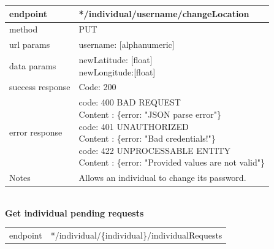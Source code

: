 \begin{legal}
\begin{legal}
\begin{itemize}
							\begin{tabularx}{\linewidth}{| l| l }
								\hline
								endpoint & */individual/{username}/changeLocation \\
								\hline
								method & PUT \\
								\hline
								url params & 
								\parbox{0.7\textwidth}{
									\bigskip
									username: [alphanumeric]
									\bigskip
								}\\
								\hline
								data params & 
								\parbox{0.7\textwidth}{
									\bigskip
									newLatitude: [float]\\
									newLongitude:[float]
									\bigskip
								} \\
								\hline
								success response &
								\parbox{0.7\textwidth}{
									\bigskip
									Code: 200
									\bigskip
								} \\
								\hline
								error response &
								\parbox{0.7\textwidth}{
									\bigskip
									code: 400 BAD REQUEST \\
									Content : \{error: "JSON parse error"\}\\
									code: 401 UNAUTHORIZED \\
									Content : \{error: "Bad credentials!"\}\\
									code: 422 UNPROCESSABLE ENTITY\\
									Content : \{error: "Provided values are not valid"\}
									\bigskip
								} \\
								\hline
								Notes & \parbox{0.7\textwidth}{
									\bigskip
									Allows an individual to change its password.
									\bigskip
								} \\
								\hline
							\end{tabularx}\\
							
							\textbf{Get individual pending requests} \\
			
								\begin{tabularx}{\linewidth}{| l| l }
									\hline
									endpoint & */individual/\{individual\}/individualRequests \\


\end{tabularx}
\end{itemize}
\end{legal}
\end{legal}

